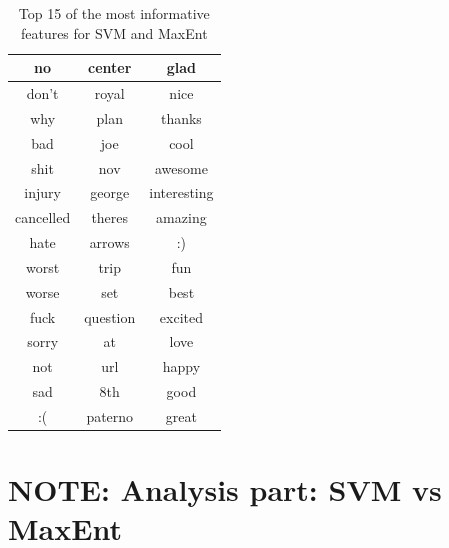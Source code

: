 \begin{table}[!htb]
\begin{minipage}{.45\linewidth}
\begin{tabular}{|c|c|c|}
		no 	& center & glad \\ \hline
		don't 	& royal & nice \\ \hline
		why 	& plan & thanks \\ \hline
		bad 	& joe & cool \\ \hline
		shit 	& nov & awesome \\ \hline
		injury 	& george & interesting \\ \hline
		cancelled 	& theres & amazing \\ \hline
		hate 	& arrows & :) \\ \hline
		worst 	& trip & fun \\ \hline
		worse 	& set & best \\ \hline
		fuck 	& question & excited \\ \hline
		sorry 	& at & love \\ \hline
		not 	& url & happy \\ \hline
		sad 	& 8th & good \\ \hline
		:( 	& paterno & great \\ \hline
		\end{tabular}
	\end{minipage}
	\caption[Most informative features]{Top 15 of the most informative features for SVM and MaxEnt}
	\label{tab:informative_features}
\end{table}



\section{NOTE: Analysis part: SVM vs MaxEnt}


